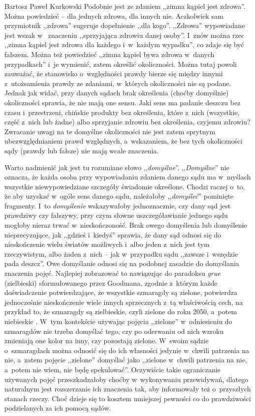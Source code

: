 \begin{artplenv}{Bartosz Paweł Kurkowski}
Podobnie jest ze zdaniem ,,zimna kąpiel jest zdrowa''. Można powiedzieć -- dla jednych zdrowa, dla innych nie. Aczkolwiek
sam przymiotnik ,,zdrowa'' sugeruje dopełnienie ,,dla kogo''. ,,Zdrowa'' wypowiadane jest wszak w~ znaczeniu ,,sprzyjająca
zdrowiu danej osoby''. I~znów można rzec ,,zimna kąpiel jest zdrowa dla każdego i~w~każdym wypadku'', co zdaje się być
fałszem. Można też powiedzieć ,,zimna kąpiel bywa zdrowa w~danych przypadkach'' i~je wymienić, zatem określić
okoliczności. Można tutaj powoli zauważać, że stanowisko o~względności prawdy bierze się między innymi z~utożsamienia
prawdy ze zdaniami, w~których okoliczności nie są podane. Jednak jak widać, przy danych sądach brak określenia (choćby
domyślnie) okoliczności sprawia, że nie mają one sensu. Jaki sens ma padanie deszczu bez czasu i~przestrzeni, chińskie
produkty bez określenia, które z~nich (wszystkie, część z~nich lub żadne) albo sprzyjanie zdrowiu bez określenia, czyjemu
zdrowiu? Zwracanie uwagi na te domyślne okoliczności nie jest zatem sprytnym ubezwzględnianiem prawd
względnych, a~wskazaniem, że bez tych okoliczności sądy (prawdy lub fałsze) nie mają wcale znaczenia.


Warto nadmienić jak jest tu rozumiane słowo ,,\textit{domyślne}''. ,,\textit{Domyślne}'' nie oznacza, że każda osoba przy
wypowiadaniu zdaniem danego sądu ma w~myślach wszystkie niewypowiedziane szczegóły świadomie określone. Chodzi
raczej o~to, że aby uzyskać w~ogóle sens danego sądu, należałoby ,,\textit{domyśleć}'' pominięte fragmenty.
I~to \textit{domyślenie}
wskazywałoby jednoznacznie, czy dany sąd jest prawdziwy czy fałszywy, przy czym słowne uszczegóławianie jednego sądu
mogłoby nieraz trwać w~nieskończoność. Brak owego domyślenia lub domyślenie nieprecyzujące, jak ,,gdzieś i~kiedyś''
sprawia, że dany sąd odnosi się do nieskończenie wielu światów możliwych i~albo jeden z~nich jest tym rzeczywistym, albo
żaden z~nich -- jak w~przypadku sądu ,,zawsze i~wszędzie pada deszcz''. Owe domyślanie odnosi się na podobnej zasadzie do
domyślania znaczenia pojęć. Najlepiej zobrazować to nawiązując do paradoksu \textit{grue} (zielbieski) sformułowanego
przez Goodmana, zgodnie z~którym każde doświadczenie potwierdzające, że wszystkie szmaragdy są zielone, potwierdza
jednocześnie nieskończenie wiele innych sprzecznych z~tą właściwością cech, na przykład to, że szmaragdy są zielbieskie,
czyli zielone do roku 2050, a~potem niebieskie
\parencite[s.~68]{grobler_prawda_2000}.
W~tym kontekście
używając pojęcia ,,zielone'' w~odniesieniu do szmaragdów nie trzeba domyślać tego, czy po oderwaniu od nich wzroku
zmieniają one kolor na inny, czy pozostają zielone. W~swoim sądzie o~szmaragdach można odnosić się do ich własności
jedynie w~chwili patrzenia na nie, a~zatem pojęcie ,,zielone'' domyślać jako ,,zielone w~chwili patrzenia na
nie, a~potem nie wiem, nie będę spekulować''. Oczywiście takie ograniczanie używanych pojęć przeszkadzałoby
choćby w~wykonywaniu
przewidywań, dlatego naturalnym jest rozszerzanie ich znaczenia tak, aby informowały też o~przyszłych stanach rzeczy.
Choć dzieje się to kosztem mniejszej pewności co do prawdziwości podzielanych za ich pomocą sądów.



\end{artplenv}
